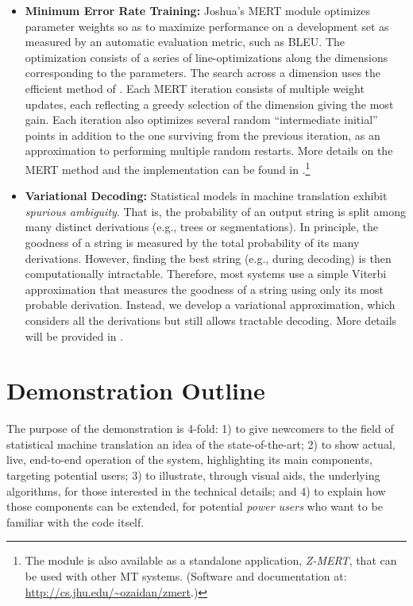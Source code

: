 \documentclass[11pt]{article}
\begin{document}
\begin{itemize}
\item \textbf{Minimum Error Rate Training:} Joshua's MERT module optimizes parameter
weights so as to maximize performance on a development set as measured by an automatic
evaluation metric, such as B{\small LEU}.  The optimization consists of a series of
line-optimizations along the dimensions corresponding to the parameters.  The search
across a dimension uses the efficient method of .  Each MERT iteration
consists of multiple weight updates, each reflecting a greedy selection of the dimension
giving the most gain.  Each iteration also optimizes several random ``intermediate
initial'' points in addition to the one surviving from the previous iteration, as an
approximation to performing multiple random restarts. More details on the MERT method
and the implementation can be found in .\footnote{The module
is also available as a standalone application, {\em Z-MERT}, that can be used with other
MT systems.  (Software and documentation at: \url{http://cs.jhu.edu/~ozaidan/zmert}.)}

\item \textbf{Variational Decoding:} Statistical models in machine translation exhibit
\emph{spurious ambiguity}.  That is, the probability of an output string is split among
many distinct derivations (e.g., trees or segmentations).  In principle, the goodness
of a string is measured by the total probability of its many derivations.  However,
finding the best string (e.g., during decoding) is then computationally intractable.
Therefore, most systems use a simple Viterbi approximation that measures the goodness
of a string using only its most probable derivation.  Instead, we develop a variational
approximation, which considers all the derivations but still allows tractable decoding.
More details will be provided in .
\end{itemize}

\section{Demonstration Outline}

The purpose of the demonstration is 4-fold: 1) to give newcomers to the field
of statistical machine translation an idea of the state-of-the-art; 2) to show
actual, live, end-to-end operation of the system,
highlighting its main components, targeting potential users; 3) to illustrate,
through visual aids, the underlying algorithms, for those interested in the
technical details; and 4) to explain how those components can be extended, for
potential \emph{power users} who want to be familiar with the code itself.
\end{document}
